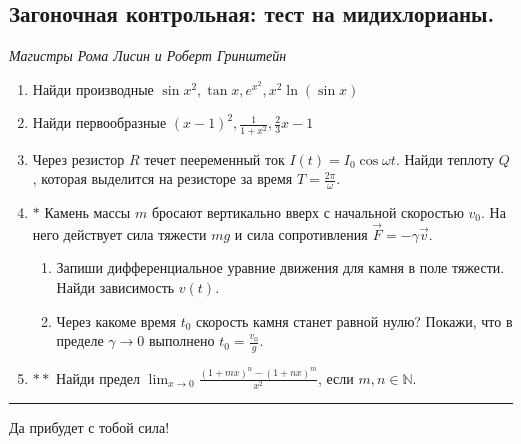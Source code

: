 \subsection*{Загоночная контрольная: тест на мидихлорианы.}
\begin{flushright}
    \textit{Магистры Рома Лисин и Роберт Гринштейн}
\end{flushright}

\begin{enumerate}
    \item Найди производные $\sin x^2, \tan x, e^{x^2}, x^2 \ln(\sin x)$
    \item Найди первообразные $(x - 1)^2, \frac{1}{1 + x^2}, \frac{2}{3}x- 1$
    \item Через резистор $R$ течет пееременный ток $I(t) = I_0 \cos \omega t$. Найди теплоту $Q$, которая выделится на резисторе за время $T = \frac{2\pi}{\omega}$.
    \item $\boldsymbol{*}$ Камень массы $m$ бросают вертикально вверх с начальной скоростью $v_0$. На него действует сила тяжести $mg$ и сила сопротивления $\vec{F} = -\gamma \vec{v}$.
    \begin{enumerate}
        \item Запиши дифференциальное уравние движения для камня в поле тяжести. Найди зависимость $v(t)$.
        \item Через какоме время $t_0$ скорость камня станет равной нулю? Покажи, что в пределе $\gamma \rightarrow 0$ выполнено $t_0 = \frac{v_0}{g}$.
    \end{enumerate}
    \item $\boldsymbol{**}$ Найди предел $\lim_{x\rightarrow 0} \frac{(1 + mx)^n - (1 + nx)^m}{x^2}$, если $m,n \in \mathbb{N}$.
\end{enumerate}
\vspace{5cm}
\hrule
\vspace{1cm}
\textsf{Да прибудет с тобой сила!}